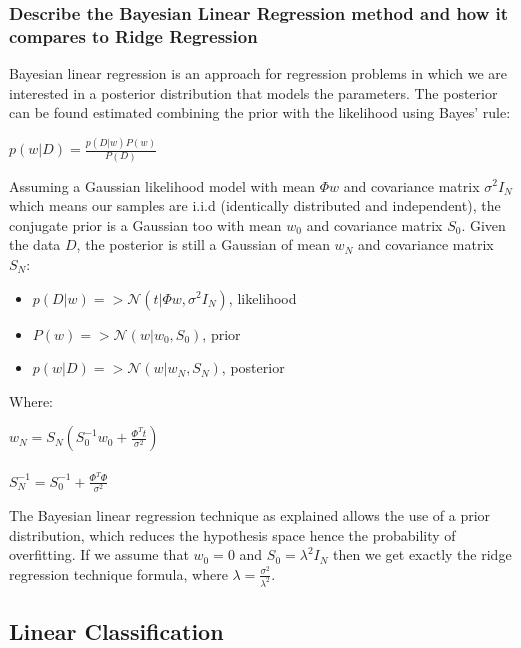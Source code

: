 \subsubsection{Describe the Bayesian Linear Regression method and how it compares to Ridge Regression}
    Bayesian linear regression is an approach for regression problems in which we are interested in a posterior distribution that models the parameters. The posterior can be found estimated combining the prior with the likelihood using Bayes' rule:
    \begin{center}
        $p(w|D)=\frac{p(D|w)P(w)}{P(D)}$
    \end{center}
    Assuming a Gaussian likelihood model with mean $\Phi w$ and covariance matrix $\sigma^2I_{N}$ which means our samples are i.i.d (identically distributed and independent), the conjugate prior is a Gaussian too with mean $w_{0}$ and covariance matrix $S_{0}$.
    Given the data $D$, the posterior is still a Gaussian of mean $w_{N}$ and covariance matrix $S_{N}$:
    \begin{itemize}
        \item $p(D|w) => \mathcal{N}(t|\Phi w,\sigma^2I_{N})$, likelihood
        \item $P(w) => \mathcal{N}(w|w_{0},S_{0})$, prior
        \item $p(w|D) => \mathcal{N}(w|w_{N},S_{N})$, posterior
    \end{itemize}
    Where:
    \begin{center}
        $w_N = S_N(S_0^{-1} w_0 + \frac{\Phi ^T t}{\sigma ^2})$ \\~\\
        $S_N ^{-1} = S_0^{-1} + \frac{\Phi ^T \Phi}{\sigma ^2 }$ \\
    \end{center}
    The Bayesian linear regression technique as explained allows the use of a prior distribution, which reduces the hypothesis space hence the probability of overfitting.
    If we assume that $w_0 = 0$ and $S_0 = \lambda ^2 I_N$ then we get exactly the ridge regression technique formula, where $
    \lambda = \frac{\sigma ^2}{\lambda ^2}$.

\subsection{Linear Classification}
